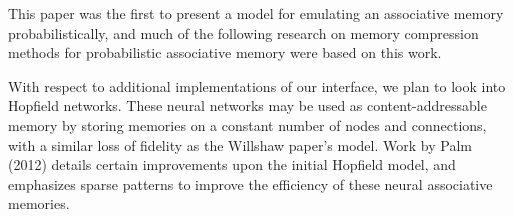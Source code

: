 \documentclass{sig-alternate}
\begin{document}
This paper was the first to present a model for emulating an associative memory
probabilistically, and much of the following research on memory compression methods
for probabilistic associative memory were based on this work.

With respect to additional implementations of our interface, we plan to look into 
Hopfield networks. These neural networks may be used as content-addressable memory by
storing memories on a constant number of nodes and connections, with a similar loss of 
fidelity as the Willshaw paper's model. Work by Palm (2012) details certain improvements
upon the initial Hopfield model, and emphasizes sparse patterns to improve the efficiency
of these neural associative memories. 


~\cite{ivanov14} %
~\cite{latex_wikibook} %
~\cite{ctan_pdf}%

\end{document}
